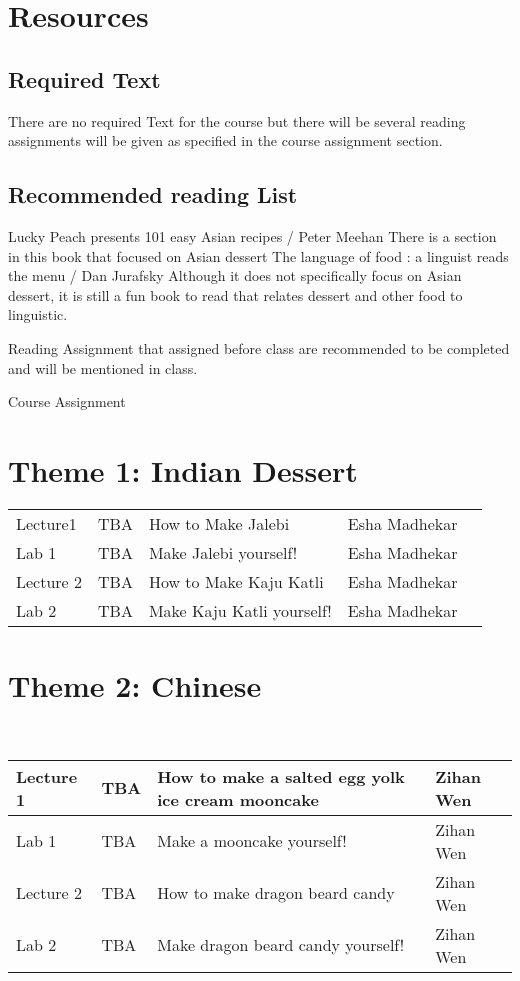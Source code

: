 \documentclass{article}
\begin{document}
\section{Resources}
\subsection{Required Text}
There are no required Text for the course but there will be several reading assignments will be given as specified in the course assignment section. 

\subsection{Recommended reading List}

Lucky Peach presents 101 easy Asian recipes / Peter Meehan 
There is a section in this book that focused on Asian dessert
The language of food : a linguist reads the menu / Dan Jurafsky
Although it does not specifically focus on Asian dessert, it is still a fun book to read that relates dessert and other food to linguistic.

Reading Assignment that assigned before class are recommended to be completed and will be mentioned in class.

Course Assignment

\section*{Theme 1: Indian Dessert}


\begin{table}[h]
\begin{tabular}{lllll}
 Lecture1 &  TBA & How to Make Jalebi & Esha Madhekar  \\
 Lab 1 &  TBA & Make Jalebi yourself! & Esha Madhekar  \\
 Lecture 2 &  TBA & How to Make Kaju Katli & Esha Madhekar  \\
 Lab 2 & TBA & Make Kaju Katli yourself! & Esha Madhekar 
\end{tabular}
\end{table}

 \section*{Theme 2: Chinese }\\
 \vspace{0.5em} \begin{tabular}{|l|l|l|l|}
\hline 
Lecture 1 & TBA & How to make a salted egg yolk ice cream mooncake & Zihan Wen\\
\hline
Lab 1 & TBA & Make a mooncake yourself!& Zihan Wen\\
\hline
Lecture 2 & TBA & How to make dragon beard candy & Zihan Wen\\
\hline 
Lab 2 & TBA & Make dragon beard candy yourself!& Zihan Wen\\
\hline
\end{tabular}
\end{document}
